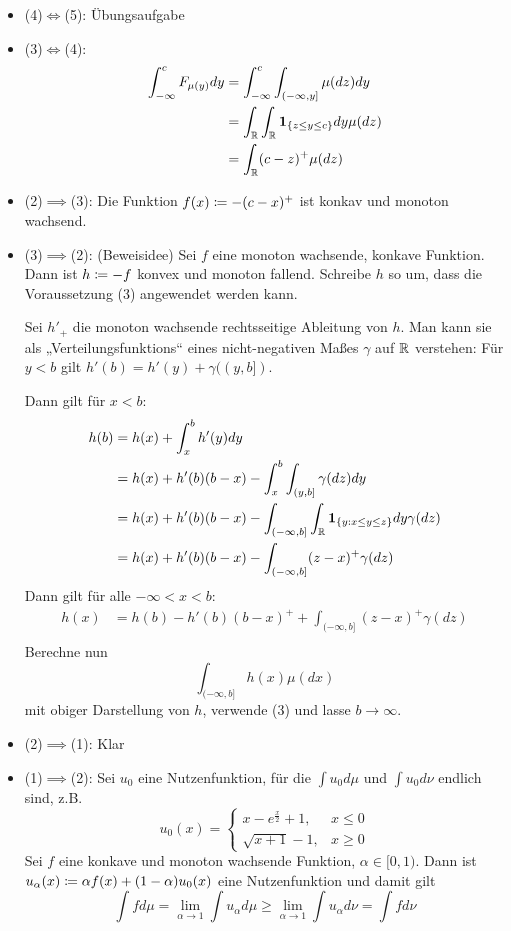 \documentclass[a4paper,twoside,DIV15,BCOR12mm]{scrbook}
\begin{document}
\begin{beweis}
\begin{itemize}
\item (4)$\iff$(5): Übungsaufgabe
\item (3)$\iff$(4):
\begin{align*}
\int_{-\infty}^c F_{\mu(y)}dy &= \int_{-\infty}^c \int_{(-\infty,y]} \mu(dz)dy \\
&=\int_{\mathbb{R}} \int_{\mathbb{R}} \mathbf 1_{\{z\le y\le c\}}dy \mu(dz) \\
&=\int_{\mathbb{R}} (c-z)^+ \mu(dz)
\end{align*}
\item (2)$\implies$(3): Die Funktion $f(x) \da -(c-x)^+$ ist konkav und monoton wachsend.
\item (3)$\implies$(2): (Beweisidee) Sei $f$ eine monoton wachsende, konkave Funktion. Dann ist $h\da -f$ konvex und monoton fallend. Schreibe $h$ so um, dass die Voraussetzung (3) angewendet werden kann.

Sei $h'_+$ die monoton wachsende rechtsseitige Ableitung von $h$. Man kann sie als „Verteilungsfunktions“ eines nicht-negativen Maßes $\gamma$ auf $\mathbb{R}$ verstehen: Für $y<b$ gilt $h'(b) = h'(y) + \gamma( (y,b])$.

Dann gilt für $x<b$:
\begin{align*}
h(b) &= h(x) + \int_x^b h'(y) dy \\
&=h(x) + h'(b)(b-x) -\int_x^b \int_{(y,b]} \gamma(dz)dy \\
&=h(x) + h'(b)(b-x) - \int_{(-\infty,b]}\int_{\mathbb{R}} \mathbf 1_{\{y:x\le y \le z\}} dy \gamma(dz) \\
&=h(x) + h'(b)(b-x) - \int_{(-\infty,b]} (z-x)^+ \gamma(dz) 
\end{align*}
Dann gilt für alle $-\infty<x<b$:
\begin{align*}
h(x) &= h(b) - h'(b)(b-x)^+ + \int_{(-\infty,b]} (z-x)^+ \gamma(dz) \\
\end{align*}
Berechne nun
\[
\int_{(-\infty,b]} h(x) \mu(dx)
\]
 mit obiger Darstellung von $h$, verwende (3) und lasse $b\to\infty$.
\item (2)$\implies$(1): Klar
\item (1)$\implies$(2): Sei $u_0$ eine Nutzenfunktion, für die $\int u_0d\mu$ und $\int u_0d\nu$ endlich sind, z.B.
\[
u_0(x) = 
\begin{cases}
x - e^{\frac x2} + 1, & x\le 0\\
\sqrt{x + 1} -1, &x\ge 0
\end{cases}
\]
Sei $f$ eine konkave und monoton wachsende Funktion, $\alpha \in [0, 1)$. Dann ist $u_\alpha(x) \da \alpha f(x) + (1-\alpha)u_0(x)$ eine Nutzenfunktion und damit gilt 
\[
\int f d\mu = \lim_{\alpha\to 1} \int u_\alpha d\mu \ge \lim_{\alpha \to 1} \int u_{\alpha}d\nu = \int f d\nu
\]
\end{itemize}
\end{beweis}
\end{document}
